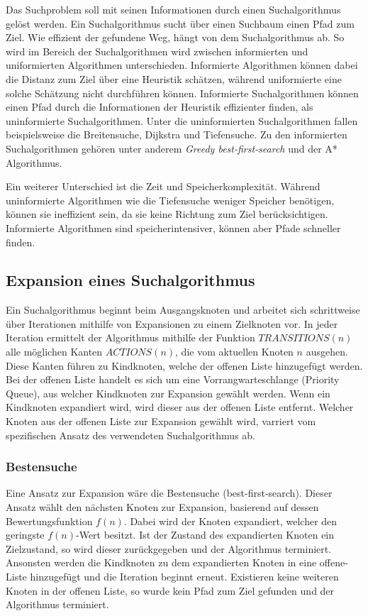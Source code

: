 Das Suchproblem soll mit seinen Informationen durch einen Suchalgorithmus gelöst werden. Ein Suchalgorithmus sucht über einen Suchbaum einen Pfad zum Ziel. Wie effizient der gefundene Weg, hängt von dem Suchalgorithmus ab. So wird im Bereich der Suchalgorithmen wird zwischen informierten und uniformierten Algorithmen unterschieden. Informierte Algorithmen können dabei die Distanz zum Ziel über eine Heuristik schätzen, während uniformierte eine solche Schätzung nicht durchführen können. Informierte Suchalgorithmen können einen Pfad durch die Informationen der Heuristik effizienter finden, als uninformierte Suchalgorithmen. Unter die uninformierten Suchalgorithmen fallen beispielsweise die Breitensuche, Dijkstra und Tiefensuche. Zu den informierten Suchalgorithmen gehören unter anderem \textit{Greedy best-first-search} und der A* Algorithmus.

Ein weiterer Unterschied ist die Zeit und Speicherkomplexität. Während uninformierte Algorithmen wie die Tiefensuche weniger Speicher benötigen, können sie ineffizient sein, da sie keine Richtung zum Ziel berücksichtigen. Informierte Algorithmen sind speicherintensiver, können aber Pfade schneller finden.


\subsection{Expansion eines Suchalgorithmus}

Ein Suchalgorithmus beginnt beim Ausgangsknoten und arbeitet sich schrittweise über Iterationen mithilfe von Expansionen zu einem Zielknoten vor. In jeder Iteration ermittelt der Algorithmus mithilfe der Funktion $TRANSITIONS(n)$ alle möglichen Kanten $ACTIONS(n)$, die vom aktuellen Knoten $n$ ausgehen. Diese Kanten führen zu Kindknoten, welche der offenen Liste hinzugefügt werden. Bei der offenen Liste handelt es sich um eine Vorrangwarteschlange (Priority Queue), aus welcher Kindknoten zur Expansion gewählt werden. Wenn ein Kindknoten expandiert wird, wird dieser aus der offenen Liste entfernt. Welcher Knoten aus der offenen Liste zur Expansion gewählt wird, varriert vom spezifischen Ansatz des verwendeten Suchalgorithmus ab.

\subsubsection{Bestensuche}

Eine Ansatz zur Expansion wäre die Bestensuche (best-first-search). Dieser Ansatz wählt den nächsten Knoten zur Expansion, basierend auf dessen Bewertungsfunktion $f(n)$. Dabei wird der Knoten expandiert, welcher den geringste $f(n)$-Wert besitzt. Ist der Zustand des expandierten Knoten ein Zielzustand, so wird dieser zurückgegeben und der Algorithmus terminiert. Ansonsten werden die Kindknoten zu dem expandierten Knoten in eine offene-Liste hinzugefügt und die Iteration beginnt erneut. Existieren keine weiteren Knoten in der offenen Liste, so wurde kein Pfad zum Ziel gefunden und der Algorithmus terminiert.

